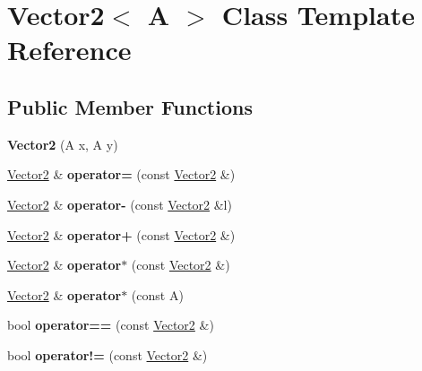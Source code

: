 \hypertarget{classVector2}{}\section{Vector2$<$ A $>$ Class Template Reference}
\label{classVector2}
\subsection*{Public Member Functions}
\begin{DoxyCompactItemize}
\item 
\hypertarget{classVector2_ad87a875fe0a1f9d24b795eb5082c59f6}{}{\bfseries Vector2} (A x, A y)\label{classVector2_ad87a875fe0a1f9d24b795eb5082c59f6}

\item 
\hypertarget{classVector2_ad54d643f80b259ed98ffe57eaba4b46b}{}\hyperlink{classVector2}{Vector2} \& {\bfseries operator=} (const \hyperlink{classVector2}{Vector2} \&)\label{classVector2_ad54d643f80b259ed98ffe57eaba4b46b}

\item 
\hypertarget{classVector2_a0316de3105dd64a029ac44f239bb4614}{}\hyperlink{classVector2}{Vector2} \& {\bfseries operator-\/} (const \hyperlink{classVector2}{Vector2} \&l)\label{classVector2_a0316de3105dd64a029ac44f239bb4614}

\item 
\hypertarget{classVector2_af53b09ee8ad8ed3231a34017a7908a71}{}\hyperlink{classVector2}{Vector2} \& {\bfseries operator+} (const \hyperlink{classVector2}{Vector2} \&)\label{classVector2_af53b09ee8ad8ed3231a34017a7908a71}

\item 
\hypertarget{classVector2_a0751923b59ad81feb1baf3dcfa9b66d6}{}\hyperlink{classVector2}{Vector2} \& {\bfseries operator$\ast$} (const \hyperlink{classVector2}{Vector2} \&)\label{classVector2_a0751923b59ad81feb1baf3dcfa9b66d6}

\item 
\hypertarget{classVector2_ac8211c6cba387f784545185b4f9ae5c1}{}\hyperlink{classVector2}{Vector2} \& {\bfseries operator$\ast$} (const A)\label{classVector2_ac8211c6cba387f784545185b4f9ae5c1}

\item 
\hypertarget{classVector2_a2079401f12939f8114010ce84e506e58}{}bool {\bfseries operator==} (const \hyperlink{classVector2}{Vector2} \&)\label{classVector2_a2079401f12939f8114010ce84e506e58}

\item 
\hypertarget{classVector2_ad36b4703bdc65df1c83c642e3c6383bc}{}bool {\bfseries operator!=} (const \hyperlink{classVector2}{Vector2} \&)\label{classVector2_ad36b4703bdc65df1c83c642e3c6383bc}


\end{DoxyCompactItemize}
